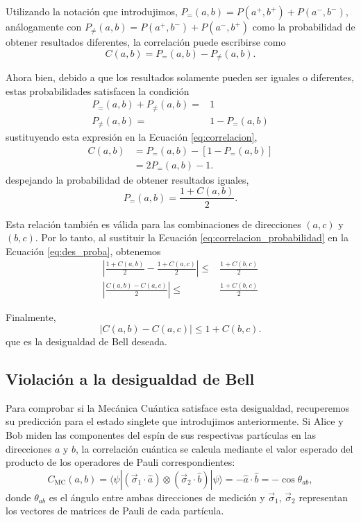 Utilizando la notación que introdujimos, $P_{=}(a,b)=P(a^+,b^+)+P(a^-,b^-)$, análogamente con $P_{\neq}(a,b)=P(a^+,b^-)+P(a^-,b^+)$ como la probabilidad de obtener resultados diferentes, la correlación puede escribirse como
\begin{equation}
	C(a,b)=P_{=}(a,b)-P_{\neq}(a,b).
	\label{eq:correlacion}
\end{equation}

Ahora bien, debido a que los resultados solamente pueden ser iguales o diferentes, estas probabilidades satisfacen la condición
\begin{align*}
	P_{=}(a,b)+P_{\neq}(a,b)=&1
	\\
	P_{\neq}(a,b)=&1-P_{=}(a,b)
\end{align*}
sustituyendo esta expresión en la Ecuación \ref{eq:correlacion},
\begin{align*}
	C(a,b)&=P_{=}(a,b)-[1-P_{=}(a,b)]
	\\
	&=2P_{=}(a,b)-1.
\end{align*}
despejando la probabilidad de obtener resultados iguales,
\begin{equation}
	P_{=}(a,b)=\frac{1+C(a,b)}{2}.
	\label{eq:correlacion_probabilidad}
\end{equation}

Esta relación también es válida para las combinaciones de direcciones $(a,c)$ y $(b,c)$. Por lo tanto, al sustituir la Ecuación \ref{eq:correlacion_probabilidad} en la Ecuación \ref{eq:des_proba}, obtenemos
\begin{align*}
	\left|\frac{1+C(a,b)}{2}-\frac{1+C(a,c)}{2}\right|\leq&\frac{1+C(b,c)}{2}
	\\
	\left|\frac{C(a,b)-C(a,c)}{2}\right|\leq&\frac{1+C(b,c)}{2}
\end{align*}

Finalmente,
\begin{equation}
	|C(a,b)-C(a,c)|\leq 1+C(b,c).
	\label{eq:des_bell}
\end{equation}
que es la desigualdad de Bell deseada. \cite{Bell}
%
%
%
%
\subsection{Violación a la desigualdad de Bell}%

Para comprobar si la Mecánica Cuántica satisface esta desigualdad, recuperemos su predicción para el estado singlete que introdujimos anteriormente. Si Alice y Bob miden las componentes del espín de sus respectivas partículas en las direcciones  $a$ y $b$, la correlación cuántica se calcula mediante el valor esperado del producto de los operadores de Pauli correspondientes:
\begin{equation}
	C_{\text{MC}}(a,b)=\langle\psi|(\vec{\sigma}_1\cdot\hat{a})\otimes(\vec{\sigma}_2\cdot\hat{b})|\psi\rangle=-\hat{a}\cdot\hat{b}=-\cos\theta_{ab},
	\label{eq:correlacion_MC}
\end{equation}
donde $\theta_{ab}$ es el ángulo entre ambas direcciones de medición y $\vec{\sigma}_1$, $\vec{\sigma}_2$ representan los vectores de matrices de Pauli de cada partícula.

